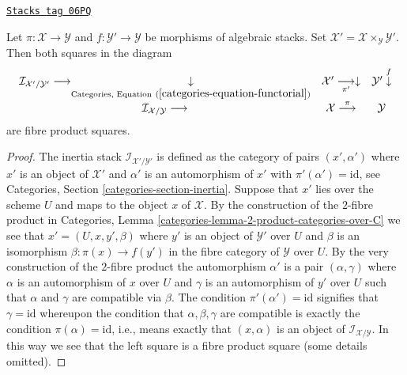 \begin{lemma}
\label{stacks-morphisms-lemma-cartesian-square-inertia}
\href{https://stacks.math.columbia.edu/tag/06PQ}{\texttt{Stacks tag 06PQ}}

Let $\pi : \mathcal{X} \to \mathcal{Y}$ and
$f : \mathcal{Y}' \to \mathcal{Y}$ be morphisms of algebraic stacks.
Set $\mathcal{X}' = \mathcal{X} \times_\mathcal{Y} \mathcal{Y}'$.
Then both squares in the diagram
$$
\begin{array}{ccc}\mathcal{I}_{\mathcal{X}'/\mathcal{Y}'} \longrightarrow\underset{
\text{Categories, Equation}\ (\ref{categories-equation-functorial})
}{\downarrow} & \mathcal{X}' \underset{\pi'}{\longrightarrow}\downarrow & \mathcal{Y}' \overset{f}{\downarrow} \\ \mathcal{I}_{\mathcal{X}/\mathcal{Y}} \longrightarrow & \mathcal{X} \overset{\pi}{\longrightarrow} & \mathcal{Y}\end{array}
$$
are fibre product squares.
\end{lemma}

\begin{proof}
The inertia stack $\mathcal{I}_{\mathcal{X}'/\mathcal{Y}'}$ is defined as the
category of pairs $(x', \alpha')$ where $x'$ is an object of $\mathcal{X}'$
and $\alpha'$ is an automorphism of $x'$ with $\pi'(\alpha') = \text{id}$, see
Categories, Section \ref{categories-section-inertia}.
Suppose that $x'$ lies over the scheme $U$ and maps to the object
$x$ of $\mathcal{X}$. By the construction of the $2$-fibre product in
Categories, Lemma \ref{categories-lemma-2-product-categories-over-C}
we see that $x' = (U, x, y', \beta)$ where $y'$ is an object of $\mathcal{Y}'$
over $U$ and $\beta$ is an isomorphism
$\beta : \pi(x) \to f(y')$ in the fibre category of $\mathcal{Y}$ over $U$.
By the very construction of the $2$-fibre product the automorphism $\alpha'$
is a pair $(\alpha, \gamma)$ where $\alpha$ is an automorphism of $x$ over $U$
and $\gamma$ is an automorphism of $y'$ over $U$ such that
$\alpha$ and $\gamma$ are compatible via $\beta$. The condition
$\pi'(\alpha') = \text{id}$ signifies that $\gamma = \text{id}$
whereupon the condition that $\alpha, \beta, \gamma$ are compatible
is exactly the condition $\pi(\alpha) = \text{id}$, i.e., means
exactly that $(x, \alpha)$ is an object of
$\mathcal{I}_{\mathcal{X}/\mathcal{Y}}$.
In this way we see that the left square is a fibre product square
(some details omitted).
\end{proof}

